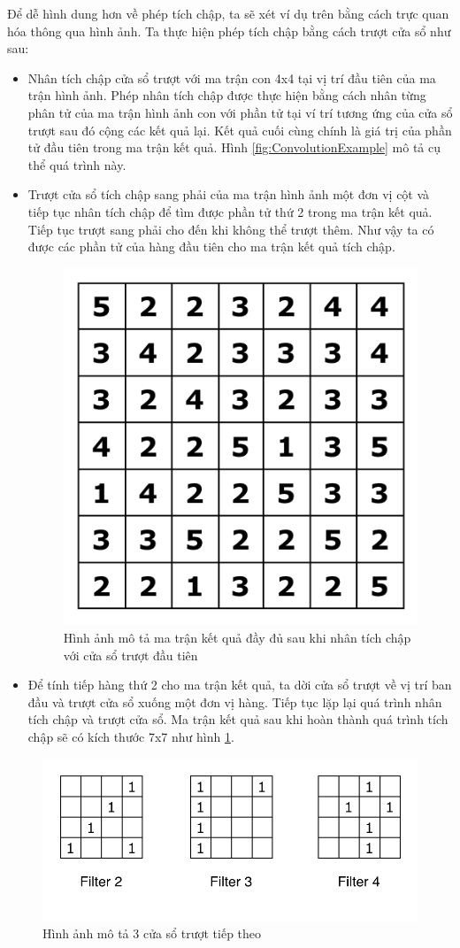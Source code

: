 Để dễ hình dung hơn về phép tích chập, ta sẽ xét ví dụ trên bằng cách trực quan hóa thông qua hình ảnh. Ta thực hiện phép tích chập bằng cách trượt cửa sổ như sau:
\begin{itemize}
\item Nhân tích chập cửa sổ trượt với ma trận con 4x4 tại vị trí đầu tiên của ma trận hình ảnh. Phép nhân tích chập được thực hiện bằng cách nhân từng phân tử của ma trận hình ảnh con với phần tử tại ví trí tương ứng của cửa sổ trượt sau đó cộng các kết quả lại. Kết quả cuối cùng chính là giá trị của phần tử đầu tiên trong ma trận kết quả. Hình \ref{fig:ConvolutionExample} mô tả cụ thể quá trình này.
\item Trượt cửa sổ tích chập sang phải của ma trận hình ảnh một đơn vị cột và tiếp tục nhân tích chập để tìm được phần tử thứ 2 trong ma trận kết quả. Tiếp tục trượt sang phải cho đến khi không thể trượt thêm. Như vậy ta có được các phần tử của hàng đầu tiên cho ma trận kết quả tích chập.

\begin{figure}[!h]
    	\centering
    		\includegraphics[width=0.4\columnwidth]{books/artificial-neural-network/chapter05/figure/convolution_filter_result_1.png}
    		\centering
    	\caption{Hình ảnh mô tả ma trận kết quả đầy đủ sau khi nhân tích chập với cửa sổ trượt đầu tiên}
    	\label{fig:ConvolutionExampleResult}
    \end{figure}

\item Để tính tiếp hàng thứ 2 cho ma trận kết quả, ta dời cửa sổ trượt về vị trí ban đầu và trượt cửa sổ xuống một đơn vị hàng. Tiếp tục lặp lại quá trình nhân tích chập và trượt cửa sổ. Ma trận kết quả sau khi hoàn thành quá trình tích chập sẽ có kích thước 7x7 như hình \ref{fig:ConvolutionExampleResult}.
\end{itemize}

\begin{figure}[!h]
	\centering
		\includegraphics[width=0.8\columnwidth]{books/artificial-neural-network/chapter05/figure/convolution_filter_2_3_4.png}
		\centering
	\caption{Hình ảnh mô tả 3 cửa sổ trượt tiếp theo}
	\label{fig:ConvolutionSample234}
\end{figure}

